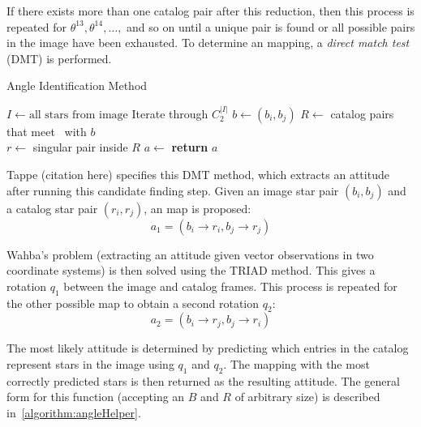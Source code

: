 If there exists more than one catalog pair after this reduction, then this process is repeated for
$\theta^{13}, \theta^{14}, \dots,$ and so on until a unique pair is found or all possible pairs in the image
have been exhausted.
To determine an mapping, a \textit{direct match test} (DMT) is performed.

\begin{algorithm} 
    \caption{Angle Identification Method} \label{algorithm:angleIdentification}
    \begin{algorithmic}[1]
        \State $I \gets \text{all stars} \text{ from image}$
         \Comment Iterate through $C^{|I|}_2$
        \State $b \gets (b_i, b_j)$
        \State $R \gets $ catalog pairs that meet~ with $b$
        \\
        \State $r \gets $ singular pair inside $R$
        \State $a \gets $ 
        \State \textbf{return} $a$
        \EndIf
        \EndFor
        \EndFor
        \EndProcedure
    \end{algorithmic}
\end{algorithm}

Tappe (citation here) specifies this DMT method, which extracts an attitude after running this candidate finding step.
Given an image star pair $(b_i, b_j)$ and a catalog star pair $(r_i, r_j)$, an map is proposed:
\begin{equation}
    a_1 = (b_i \rightarrow r_i, b_j \rightarrow r_j)
\end{equation}

Wahba's problem (extracting an attitude given vector observations in two coordinate systems) is then solved using the
TRIAD method.
This gives a rotation $q_1$ between the image and catalog frames.
This process is repeated for the other possible map to obtain a second rotation $q_2$:
\begin{equation}
    a_2 = (b_i \rightarrow r_j, b_j \rightarrow r_i)
\end{equation}

The most likely attitude is determined by predicting which entries in the catalog represent stars in the image using
$q_1$ and $q_2$.
The mapping with the most correctly predicted stars is then returned as the resulting attitude.
The general form for this function (accepting an $B$ and $R$ of arbitrary size) is described
in~\autoref{algorithm:angleHelper}.

